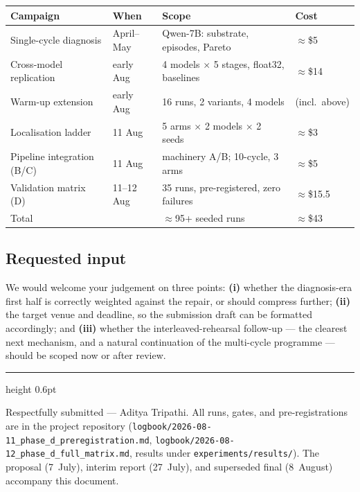 \documentclass[11pt]{article}
\begin{document}
\begin{center}
\small
\begin{tabular}{@{}l l l l@{}}
\toprule
Campaign & When & Scope & Cost \\
\midrule
Single-cycle diagnosis        & April--May  & Qwen-7B: substrate, episodes, Pareto & $\approx$\$5 \\
Cross-model replication       & early Aug   & 4 models $\times$ 5 stages, float32, baselines & $\approx$\$14 \\
Warm-up extension             & early Aug   & 16 runs, 2 variants, 4 models & (incl.\ above) \\
Localisation ladder           & 11 Aug      & 5 arms $\times$ 2 models $\times$ 2 seeds & $\approx$\$3 \\
Pipeline integration (B/C)    & 11 Aug      & machinery A/B; 10-cycle, 3 arms & $\approx$\$5 \\
Validation matrix (D)         & 11--12 Aug  & 35 runs, pre-registered, zero failures & $\approx$\$15.5 \\
\midrule
Total & & $\approx$95+ seeded runs & $\approx$\$43 \\
\bottomrule
\end{tabular}
\end{center}

\subsection{Requested input}

We would welcome your judgement on three points: \textbf{(i)} whether the diagnosis-era first half
is correctly weighted against the repair, or should compress further; \textbf{(ii)} the target
venue and deadline, so the submission draft can be formatted accordingly; and \textbf{(iii)}
whether the interleaved-rehearsal follow-up --- the clearest next mechanism, and a natural
continuation of the multi-cycle programme --- should be scoped now or after review.

\vspace{0.8em}
{\color{rule}\hrule height 0.6pt}
\vspace{0.4em}
{\color{softgrey}\small Respectfully submitted --- Aditya Tripathi. All runs, gates, and
pre-registrations are in the project repository
(\texttt{logbook/2026-08-11\_phase\_d\_preregistration.md},
\texttt{logbook/2026-08-12\_phase\_d\_full\_matrix.md}, results under
\texttt{experiments/results/}). The proposal (7~July), interim report (27~July), and superseded
final (8~August) accompany this document.}
\end{document}
